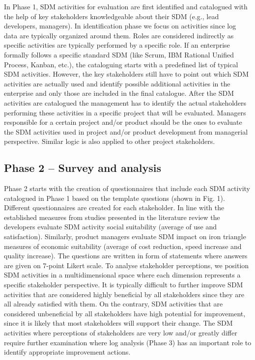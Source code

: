 In Phase 1, SDM activities for evaluation are first identified and catalogued with the help of
key stakeholders knowledgeable about their SDM (e.g., lead developers, managers). In identification
phase we focus on activities since log data are typically organized around them. Roles are considered
indirectly as specific activities are typically performed by a specific role. If an enterprise formally
follows a specific standard SDM (like Scrum, IBM Rational Unified Process, Kanban, etc.), the
cataloguing starts with a predefined list of typical SDM activities. However, the key stakeholders still
have to point out which SDM activities are actually used and identify possible additional activities in
the enterprise and only those are included in the final catalogue. After the SDM activities are
catalogued the management has to identify the actual stakeholders performing these activities in a
specific project that will be evaluated. Managers responsible for a certain project and/or product
should be the ones to evaluate the SDM activities used in project and/or product development from
managerial perspective. Similar logic is also applied to other project stakeholders.

\subsection{Phase 2 – Survey and analysis}
Phase 2 starts with the creation of questionnaires that include each SDM activity catalogued
in Phase 1 based on the template questions (shown in Fig. 1). Different questionnaires are created
for each stakeholder. In line with the established measures from studies presented in the literature
review the developers evaluate SDM activity social suitability (average of use and satisfaction).
Similarly, product managers evaluate SDM impact on iron triangle measures of economic suitability
(average of cost reduction, speed increase and quality increase). The questions are written in form of
statements where answers are given on 7-point Likert scale.
To analyse stakeholder perceptions, we position SDM activities in a multidimensional space
where each dimension represents a specific stakeholder perspective. It is typically difficult to further
improve SDM activities that are considered highly beneficial by all stakeholders since they are all already satisfied with them. On the contrary, SDM activities that are considered unbeneficial by all
stakeholders have high potential for improvement, since it is likely that most stakeholders will
support their change. The SDM activities where perceptions of stakeholders are very low and/or
greatly differ require further examination where log analysis (Phase 3) has an important role to
identify appropriate improvement actions.


